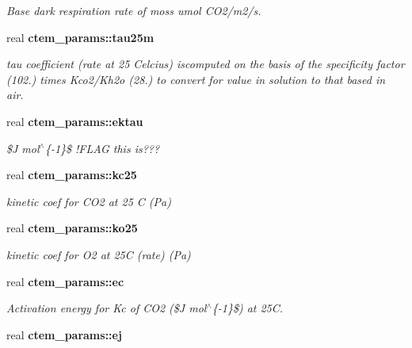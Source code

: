 \begin{DoxyCompactItemize}
\begin{DoxyCompactList}\small\item\em Base dark respiration rate of moss umol C\+O2/m2/s. \end{DoxyCompactList}\item 
\hypertarget{namespacectem__params_a26fe22d544842a462db3a764fb43effd}{}real {\bfseries ctem\+\_\+params\+::tau25m}\label{namespacectem__params_a26fe22d544842a462db3a764fb43effd}

\begin{DoxyCompactList}\small\item\em tau coefficient (rate at 25 Celcius) iscomputed on the basis of the specificity factor (102.) times Kco2/\+Kh2o (28.) to convert for value in solution to that based in air. \end{DoxyCompactList}\item 
\hypertarget{namespacectem__params_ac7eca9b5a082ee77a63738607a2b453d}{}real {\bfseries ctem\+\_\+params\+::ektau}\label{namespacectem__params_ac7eca9b5a082ee77a63738607a2b453d}

\begin{DoxyCompactList}\small\item\em \$\+J mol$^\wedge$\{-\/1\}\$ !\+F\+L\+A\+G this is??? \end{DoxyCompactList}\item 
\hypertarget{namespacectem__params_a4346f2333823e9b18ccb292128180726}{}real {\bfseries ctem\+\_\+params\+::kc25}\label{namespacectem__params_a4346f2333823e9b18ccb292128180726}

\begin{DoxyCompactList}\small\item\em kinetic coef for C\+O2 at 25 C (Pa) \end{DoxyCompactList}\item 
\hypertarget{namespacectem__params_aeb7cdce1fb150241fa26098d767fe9dd}{}real {\bfseries ctem\+\_\+params\+::ko25}\label{namespacectem__params_aeb7cdce1fb150241fa26098d767fe9dd}

\begin{DoxyCompactList}\small\item\em kinetic coef for O2 at 25\+C (rate) (Pa) \end{DoxyCompactList}\item 
\hypertarget{namespacectem__params_a28ee6d98bc1361ecb84e26e13942fe7d}{}real {\bfseries ctem\+\_\+params\+::ec}\label{namespacectem__params_a28ee6d98bc1361ecb84e26e13942fe7d}

\begin{DoxyCompactList}\small\item\em Activation energy for Kc of C\+O2 (\$\+J mol$^\wedge$\{-\/1\}\$) at 25\+C. \end{DoxyCompactList}\item 
\hypertarget{namespacectem__params_a5eb23f336fa9f9d97c402d5eb03ff3c7}{}real {\bfseries ctem\+\_\+params\+::ej}\label{namespacectem__params_a5eb23f336fa9f9d97c402d5eb03ff3c7}


\end{DoxyCompactItemize}
